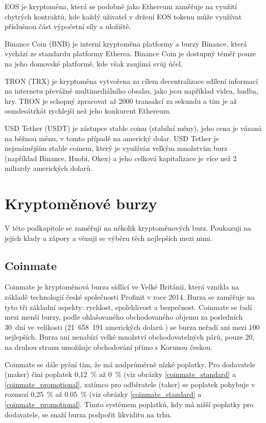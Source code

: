 \documentclass[thesis=B,czech]{FITthesis}[2019/03/21]
\begin{document}
EOS je kryptoměna, která se podobně jako Ethereum zaměřuje na využití chytrých kontraktů, kde každý uživatel v držení EOS tokenu může využívat příslušnou část výpočetní síly a uložiště. \cite{finex_eos}

Binance Coin (BNB) je interní kryptoměna platformy a burzy Binance, která vychází ze standardu platformy Etherea. Binance Coin je dostupný téměř pouze na jeho domovské platformě, kde však zaujímá svůj účel. \cite{martin_sistek_bnb}

TRON (TRX) je kryptoměna vytvořena za cílem decentralizace sdílení informací na internetu převážně multimediálního obsahu, jako jsou například videa, hudba, hry. TRON je schopný zpracovat až 2000 transakcí za sekundu a tím je až osmdesátrkát rychlejší než jeho konkurent Ethereum. \cite{finex_trx}

USD Tether (USDT) je zástupce stable coinu (stabilní měny), jeho cena je vázaná na běžnou měnu, v tomto případě na americký dolar. USD Tether je nejznámějším stable coinem, který je využíván velkým množstvím burz (například Binance, Huobi, Okex) a jeho celková kapitalizace je více než 2 miliardy amerických dolarů. \cite{mlady_investor_stable_coin} 

\section{Kryptoměnové burzy}
\label{cryptocurrency_exchanges}
V této podkapitole se zaměřuji na několik kryptoměnových burz. Poukazuji na jejich klady a zápory a věnuji se výběru těch nejlepších mezi nimi.

\subsection{Coinmate}
Coinmate je kryptoměnová burza sídlící ve Velké Británii, která vznikla na základě technologií české společnosti Profinit v roce 2014. Burza se zaměřuje na tyto tři základní aspekty: rychlost, spolehlivost a bezpečnost. Coinmate se řadí mezi menší burzy, podle ohlašovaného obchodovaného objemu za posledních 30~dní ve velikosti (21~658~191 amerických dolarů \cite{coin360}) se burza neřadí ani mezi 100 nejlepších. \cite{coinmarketcap} Burza ani nenabízí velké množství obchodovatelných párů, pouze 20, na druhou stranu umožňuje obchodování přímo s Korunou českou. 

Coinmate se dále pyšní tím, že má nadprůměrně nízké poplatky. Pro dodavatele (maker) činí poplatek 0,12~\% až 0~\% (viz obrázky \ref{coinmate_standard} a \ref{coinmate_promotional}, zatímco pro odběratele (taker) se poplatek pohybuje v rozmezí 0,25~\% až 0.05~\% (viz obrázky \ref{coinmate_standard} a \ref{coinmate_promotional}. Tímto systémem poplatků, kdy má nižší poplatky pro dodavatele, se snaží burza podpořit likviditu na trhu. \cite{cryptowisser_coinmate} \cite{coinmate_fees}
\end{document}

